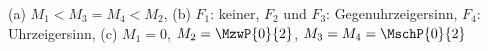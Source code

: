 (a) $M_1 < M_3 = M_4 < M_2$, (b) $F_1$: keiner, $F_2$ und $F_3$: Gegenuhrzeigersinn, $F_4$: Uhrzeigersinn, (c) $M_1 = 0$, $M_2 = \MzwP{0}{2}$, $M_3 = M_4 = \MschP{0}{2}$
